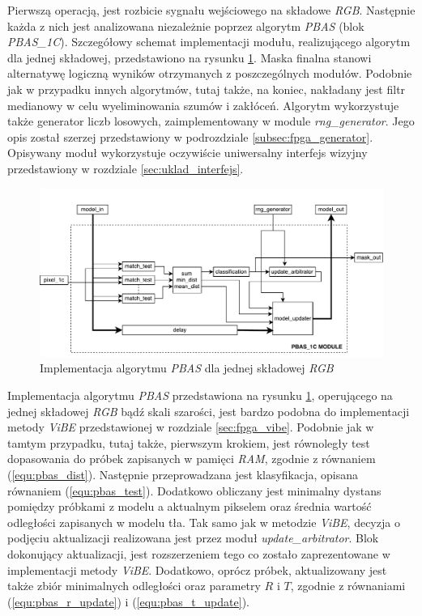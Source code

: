 Pierwszą operacją, jest rozbicie sygnału wejściowego na składowe \textit{RGB}. Następnie każda z nich jest analizowana niezależnie poprzez algorytm \textit{PBAS} (blok \textit{PBAS\_1C}). Szczegółowy schemat implementacji modułu, realizującego algorytm dla jednej składowej, przedstawiono na rysunku \ref{fig:pbas_1c_diagram}. Maska finalna stanowi alternatywę logiczną wyników otrzymanych z poszczególnych modułów. Podobnie jak w przypadku innych algorytmów, tutaj także, na koniec, nakładany jest filtr medianowy w celu wyeliminowania szumów i zakłóceń. Algorytm wykorzystuje także generator liczb losowych, zaimplementowany w module \textit{rng\_generator}. Jego opis został szerzej przedstawiony w podrozdziale \ref{subsec:fpga_generator}. Opisywany moduł wykorzystuje oczywiście uniwersalny interfejs wizyjny przedstawiony w rozdziale \ref{sec:uklad_interfejs}. 
	
	\begin{figure}[h!]
		\centering
		\includegraphics[scale=0.55]{img/4/pbas_1c.pdf}
		\caption{Implementacja algorytmu \textit{PBAS} dla jednej składowej \textit{RGB}}
		\label{fig:pbas_1c_diagram}
	\end{figure}	
	
Implementacja algorytmu \textit{PBAS} przedstawiona na rysunku \ref{fig:pbas_1c_diagram}, operującego na jednej składowej \textit{RGB} bądź skali szarości, jest bardzo podobna do implementacji metody \textit{ViBE} przedstawionej w rozdziale \ref{sec:fpga_vibe}. Podobnie jak w tamtym przypadku, tutaj także, pierwszym krokiem, jest równoległy test dopasowania do próbek zapisanych w pamięci \textit{RAM}, zgodnie z równaniem (\ref{equ:pbas_dist}). Następnie przeprowadzana jest klasyfikacja, opisana równaniem (\ref{equ:pbas_test}). Dodatkowo obliczany jest minimalny dystans pomiędzy próbkami z modelu a aktualnym pikselem oraz średnia wartość odległości zapisanych w modelu tła. Tak samo jak w metodzie \textit{ViBE}, decyzja o podjęciu aktualizacji realizowana jest przez moduł \textit{update\_arbitrator}. Blok dokonujący aktualizacji, jest rozszerzeniem tego co zostało zaprezentowane w implementacji metody \textit{ViBE}. Dodatkowo, oprócz próbek, aktualizowany jest także zbiór minimalnych odległości oraz parametry $R$ i $T$, zgodnie z równaniami (\ref{equ:pbas_r_update}) i (\ref{equ:pbas_t_update}).

